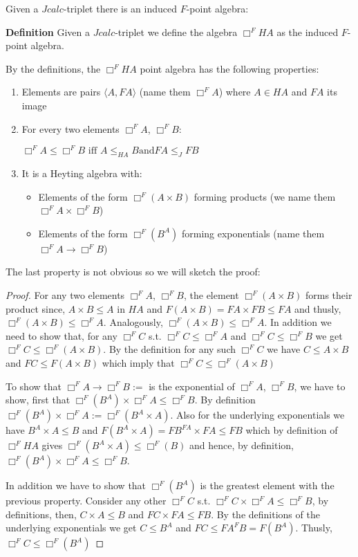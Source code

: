 			Given a $Jcalc$-triplet there is an induced $F$-point algebra:
			\begin{mdframed}
				\textbf{Definition}
				Given a $Jcalc$-triplet we define the algebra  $\Box^{F}HA$ as the induced $F$-point algebra.
			\end{mdframed}
			By the definitions, the $\Box^{F}HA$ point algebra has the following properties:
			\begin{enumerate}
				\item Elements are pairs $\langle A, FA\rangle$ (name them $\Box^{F}A$) where $A\in HA$ and $FA$ its image
				\item For every two elements $\Box^{F}A$, $\Box^{F}B$:

				$\Box^{F}A \le\Box^{F}B \text{ iff } A\le_{HA}B \text{and} FA\le_J FB $ 
				
				\item It is a Heyting algebra with:
				\begin{itemize}
					\item Elements of the form $\Box^F (A \times B)$ 
					forming products (we name them $\Box^F A\times \Box^F B$)
					\item Elements of the form $\Box^F ( B^{A})$ 
					forming exponentials (name them $\Box^F{A}\rightarrow \Box^F B$)
				\end{itemize}
			\end{enumerate}
			The last property is not obvious so we will sketch the proof:
			\begin{theorem}
			\end{theorem}
			\begin{proof}
				For any two elements $\Box^F A$, $\Box^F B$, the element $\Box^F (A \times B)$ forms their product since,
				$A \times B\le A$ in $HA$ and $F(A\times B)=FA\times FB \le FA$ and thusly, 
				$\Box^F (A \times B)\le \Box^FA$.
				Analogously, $\Box^F (A \times B)\le \Box^FA$. 
				In addition we need to show that, for any $\Box^F C$ s.t. $\Box^F C\le \Box^F A $ and 
				$\Box^F C\le \Box^F B $ we get $\Box^F C\le\Box^F(A\times B)$. 
				By the definition for any such  $\Box^F C$ we have $C\le A\times B$
				and $FC\le F(A\times B)$ which imply that $\Box^F C\le\Box^F(A\times B)$

				To show that  $\Box^F A \rightarrow \Box^F B:= $ is the  
				exponential of $\Box^FA$, $\Box^FB$, 
				we have to show, first that $\Box^F ( B^{A})\times\Box^F A\le \Box^F B$.
				By definition $\Box^F ( B^{A})\times\Box^F A :=\Box^F( B^{A}\times A)$. Also
				for the underlying exponentials we have $ B^{A}\times A\le B$ and 
				$F(B^{A}\times A)= FB^{FA}\times FA \le FB$ which by definition of $\Box^F HA$
				gives   $\Box^F(B^{A}\times A)\le \Box^F(B)$ and hence, by definition, $\Box^F ( B^{A})\times \Box^F A\le \Box^F B$.

				In addition we have to show that $\Box^F ( B^{A})$ is the greatest element with the previous property.
				Consider any other $\Box^F C$ s.t. $\Box^F C\times\Box^F A\le \Box^F B$, by definitions, then, $C\times A\le B$
				 and $FC\times FA\le FB$. By the definitions of the underlying exponentials we get $C\le B^A$ and 
				 $FC \le FA^FB =F(B^A)$. Thusly, $\Box^F C\le \Box^F(B^A)$  
			\end{proof}


